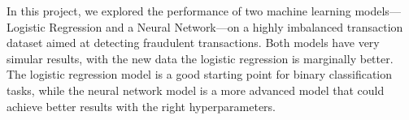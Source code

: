 \documentclass[a4, 10 pt, conference]{ieeeconf}  %
\begin{document}



\begin{center}
  \begin{table}[!h]

  \end{table}
\end{center}
In this project, we explored the performance of two machine learning models—Logistic Regression and a Neural Network—on a highly imbalanced transaction dataset aimed at detecting fraudulent transactions.
Both models have very simular results, with the new data the logistic regression is marginally better. 
The logistic regression model is a good starting point for binary classification tasks, 
while the neural network model is a more advanced model that could achieve better results with the right hyperparameters.
\end{document}
